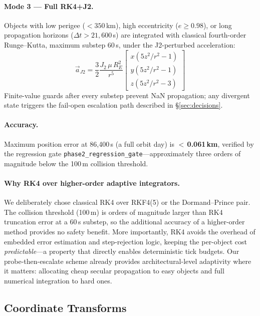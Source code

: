 \documentclass[10pt,twocolumn,letterpaper]{article}
\begin{document}
\paragraph{Mode 3 --- Full RK4+J2.}
Objects with low perigee ($< 350$\,km), high eccentricity ($e \geq 0.98$),
or long propagation horizons ($\Delta t > 21{,}600$\,s) are integrated
with classical fourth-order Runge--Kutta, maximum substep 60\,s,
under the J2-perturbed acceleration:
%
\begin{equation}
  \vec{a}_{J2} = \frac{3}{2}\frac{J_2\,\mu\,R_E^2}{r^5}
  \begin{bmatrix}
    x(5z^2/r^2 - 1) \\
    y(5z^2/r^2 - 1) \\
    z(5z^2/r^2 - 3)
  \end{bmatrix}
\label{eq:j2}
\end{equation}
%
Finite-value guards after every substep prevent NaN propagation;
any divergent state triggers the fail-open escalation path described in
\S\ref{sec:decisions}.

\paragraph{Accuracy.}  Maximum position error at 86{,}400\,s
(a full orbit day) is \textbf{$<$\,0.061\,km}, verified by the
regression gate \texttt{phase2\_regression\_gate}---approximately
three orders of magnitude below the 100\,m collision threshold.

\paragraph{Why RK4 over higher-order adaptive integrators.}
We deliberately chose classical RK4 over RKF4(5) or the Dormand--Prince
pair.  The collision threshold (100\,m) is orders of magnitude larger than
RK4 truncation error at a 60\,s substep, so the additional accuracy of a
higher-order method provides no safety benefit.  More importantly, RK4
avoids the overhead of embedded error estimation and step-rejection logic,
keeping the per-object cost \emph{predictable}---a property that directly
enables deterministic tick budgets.  Our probe-then-escalate scheme
already provides architectural-level adaptivity where it
matters: allocating cheap secular propagation to easy objects and full
numerical integration to hard ones.

\subsection{Coordinate Transforms}
\end{document}
